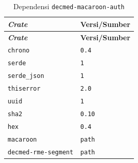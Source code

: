 \begin{longtable}{|>{\raggedright\arraybackslash}p{}|>{\raggedright\arraybackslash}p{}|}
	\caption{Dependensi \texttt{decmed-macaroon-auth}}
	\label{tab:dependensi-decmed-macaroon-auth}         \\
	\hline
	\textbf{\textit{Crate}}     & \textbf{Versi/Sumber} \\
	\hline
	\endfirsthead
	\hline
	\textbf{\textit{Crate}}     & \textbf{Versi/Sumber} \\
	\hline
	\endhead

	\texttt{chrono}             & \texttt{0.4}          \\ \hline
	\texttt{serde}              & \texttt{1}            \\ \hline
	\texttt{serde\_json}        & \texttt{1}            \\ \hline
	\texttt{thiserror}          & \texttt{2.0}          \\ \hline
	\texttt{uuid}               & \texttt{1}            \\ \hline
	\texttt{sha2}               & \texttt{0.10}         \\ \hline
	\texttt{hex}                & \texttt{0.4}          \\ \hline
	\texttt{macaroon}           & \texttt{path}         \\ \hline
	\texttt{decmed-rme-segment} & \texttt{path}         \\ \hline
\end{longtable}

